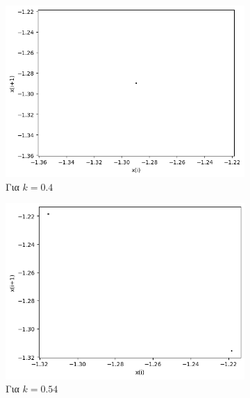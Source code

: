 \begin{figure}[ht]
	\centering
	
	\begin{subfigure}[b]{0.4\textwidth}
		\centering
		\includegraphics[width=\textwidth]{LateX images/graphs q14/g11}
		\caption{Για $k=0.4$}
		\label{f:k}
	\end{subfigure}
	\hfill
	\begin{subfigure}[b]{0.4\textwidth}
		\centering
		\includegraphics[width=\textwidth]{LateX images/graphs q14/g12}
		\caption{Για $k=0.54$}
		\label{f:k69}
	\end{subfigure}
	\hfill
	\begin{subfigure}[b]{0.4\textwidth}
		\centering

\end{subfigure}
\end{figure}
